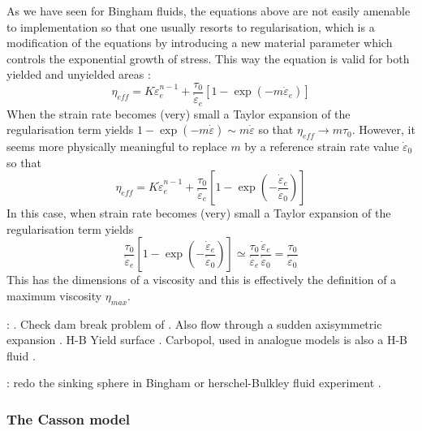 As we have seen for Bingham fluids, the equations above are not easily amenable to implementation so that 
one usually resorts to regularisation, which is a modification of the 
equations by introducing a new material parameter which controls the exponential 
growth of stress. This way the equation is valid for both yielded and unyielded areas
\cite{blmi97,papa87,zifr07,svna18}:
\begin{equation}
\eta_{eff} = K \dot{\varepsilon}_e^{n-1} + \frac{\tau_0}{\dot{\varepsilon}_e} [1 - \exp(-m \dot{\varepsilon}_e)] 
\end{equation}
When the strain rate becomes (very) small a Taylor expansion of the regularisation 
term yields $1- \exp(-m \dot{\varepsilon}) \sim m \dot{\varepsilon} $ so that 
$\eta_{eff} \rightarrow m \tau_0$.
However, it seems more physically meaningful to replace $m$ by a reference strain rate value $\dot{\varepsilon}_0$ so that 
\begin{equation}
\eta_{eff} = K \dot{\varepsilon}_e^{n-1} + \frac{\tau_0}{\dot{\varepsilon}_e} \left[1 - \exp\left(-\frac{\dot{\varepsilon}_e}{\dot{\varepsilon}_0} \right) \right] 
\end{equation}
In this case, when strain rate becomes (very) small a Taylor expansion of the regularisation
term yields
\begin{equation}
\frac{\tau_0}{\dot{\varepsilon}_e} \left[1 - \exp\left(-\frac{\dot{\varepsilon}_e}{\dot{\varepsilon}_0} \right) \right]
\simeq 
\frac{\tau_0}{\dot{\varepsilon}_e} \frac{\dot{\varepsilon}_e}{\dot{\varepsilon}_0}
=
\frac{\tau_0}{\dot{\varepsilon}_0} 
\end{equation}
This has the dimensions of a viscosity and this is effectively the definition of a maximum viscosity $\eta_{max}$.


\Literature: \cite{madd13,mazf}. Check dam break problem of \cite{anco09,coan09,bafp09,tagm09,miga09}.
Also flow through a sudden axisymmetric expansion \cite{jamp01}. H-B Yield surface \cite{buae99}.
Carbopol, used in analogue models is also a H-B fluid \cite{dicf15}.


\mscthesis{}: redo the sinking sphere in Bingham or herschel-Bulkley fluid experiment \cite{demj04,gafp17}. 

\subsubsection{The Casson model}

